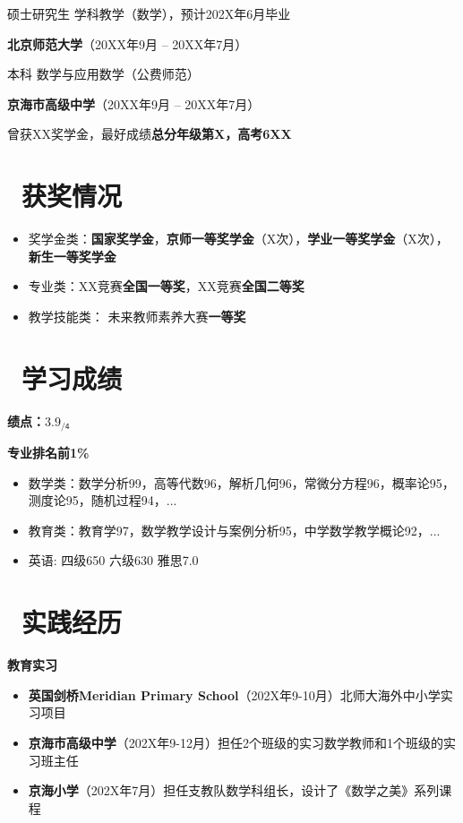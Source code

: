 \documentclass[11pt]{article}
\begin{document}
\qquad 硕士研究生 \quad 学科教学（数学），预计202X年6月毕业

\textbf{北京师范大学}（20XX年9月 -- 20XX年7月）

\qquad 本科 \quad 数学与应用数学（公费师范）

\textbf{京海市高级中学}（20XX年9月 -- 20XX年7月） %

\qquad 曾获XX奖学金，最好成绩\textbf{总分年级第X，高考6XX}

\section{\makebox[\widthof{\faGraduationCap}][c]{\color{CVBlue}\faTrophy}\ 获奖情况}
\begin{itemize}
	\item 奖学金类：\textbf{国家奖学金}，\textbf{京师一等奖学金}（X次），\textbf{学业一等奖学金}（X次），\textbf{新生一等奖学金}
	\item 专业类：XX竞赛\textbf{全国一等奖}，XX竞赛\textbf{全国二等奖}
	\item 教学技能类： 未来教师素养大赛\textbf{一等奖}
\end{itemize}


\section{\makebox[\widthof{\faGraduationCap}][c]{\color{CVBlue}\faFileText}\ 学习成绩}
\textbf{绩点：$\mathsf{3.9_{/4}}$} \

\textbf{专业排名前1\%}
\begin{itemize}[parsep=0.5ex]
	\item 数学类：数学分析99，高等代数96，解析几何96，常微分方程96，概率论95，测度论95，随机过程94，...
	\item 教育类：教育学97，数学教学设计与案例分析95，中学数学教学概论92，...
	\item 英语: 四级650 六级630 雅思7.0
\end{itemize}


\section{\makebox[\widthof{\faGraduationCap}][c]{\color{CVBlue}\faUniversity}\ 实践经历}
\textbf{教育实习}
\begin{itemize}
	\item \textbf{英国剑桥Meridian Primary School}（202X年9-10月）北师大海外中小学实习项目
	\item \textbf{京海市高级中学}（202X年9-12月）担任2个班级的实习数学教师和1个班级的实习班主任
	\item \textbf{京海小学}（202X年7月）担任支教队数学科组长，设计了《数学之美》系列课程
\end{itemize}
\end{document}
